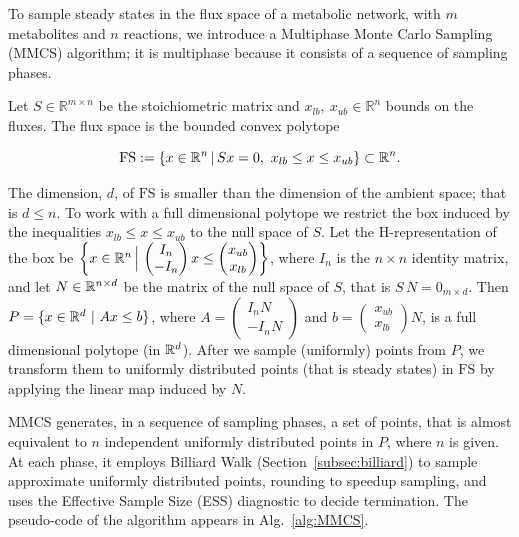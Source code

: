    To sample steady states in the flux space of a metabolic network, with $m$
   metabolites and $n$ reactions, we introduce a Multiphase Monte Carlo Sampling
   (MMCS) algorithm; it is multiphase because it consists of a sequence of sampling
   phases.

   Let $S\in\mathbb{R}^{m\times n}$ be the  stoichiometric matrix
   and  $x_{lb},\ x_{ub}\in\mathbb{R}^{n}$
   bounds on the fluxes.
   The flux space is the bounded convex polytope

   \begin{equation}
   \label{eq:steady_states}
      \mathrm{FS} :=  \{x \in {\mathbb R}^n \,|\, Sx = 0,\ x_{lb}\leq x \leq x_{ub} \} \subset {\mathbb R}^n .
   \end{equation}

   The dimension, $d$, of $\mathrm{FS}$ is smaller than the dimension of the
   ambient space; that is $d \leq n$.
   To work with a full dimensional polytope we restrict the box
   induced by the inequalities $x_{lb}\leq x \leq x_{ub}$ to the null space of  $S$.
   Let the  H-representation of the box be
   $\left\{ x \in {\mathbb R}^n \,\Big |\, \begin{pmatrix} I_n \\ -I_n\end{pmatrix} x
   \leq \begin{pmatrix} x_{ub} \\ x_{lb} \end{pmatrix} \right\}$,
   where $I_n$ is the $n\times n$ identity matrix,
   and let $N\in{\mathbb R}^{n\times d}$ be the matrix of the null space of $S$,
   that is $S \, N = 0_{m \times d}$.
   Then
   $P = \{ x\in{\mathbb R}^d\ |\ A x \leq b \}$,
   where $A = \begin{pmatrix} I_n N \\ -I_n N\end{pmatrix}$
   and $b = \begin{pmatrix} x_{ub} \\ x_{lb} \end{pmatrix}  N$,
   is a
   full dimensional polytope (in ${\mathbb R}^d$).
   After we sample (uniformly) points from $P$,
   we transform them to uniformly distributed points (that is steady states) in $\mathrm{FS}$
   by applying  the linear map induced by $N$.

   \vspace{8pt}
   MMCS generates, in a sequence of sampling phases, a set of points,
   that is almost equivalent to $n$ independent uniformly distributed points in $P$, where $n$ is given.
   At each phase, it employs Billiard Walk (Section~\ref{subsec:billiard}) 
   to sample approximate uniformly distributed points, rounding
   to speedup sampling,
   and uses the Effective Sample Size (ESS) diagnostic to decide termination.
   The pseudo-code of the algorithm appears in Alg.~\ref{alg:MMCS}.



